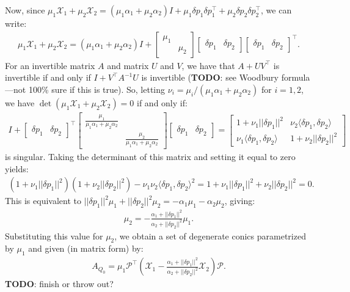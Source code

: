 \documentclass{article}
\theoremstyle{definition}
\begin{document}
Now, since
$\mu_1 \mathcal{X}_1 + \mu_2 \mathcal{X}_2 = (\mu_1 \alpha_1 + \mu_2 \alpha_2) I + \mu_1
\delta p_1 \delta p_1^\top + \mu_2 \delta p_2 \delta p_2^\top$, we can write:
\begin{align*}
  \mu_1 \mathcal{X}_1 + \mu_2 \mathcal{X}_2 = (\mu_1 \alpha_1 + \mu_2 \alpha_2) I + \begin{bmatrix} \mu_1 & \\ & \mu_2 \end{bmatrix} \begin{bmatrix} \delta p_1 & \delta p_2 \end{bmatrix} \begin{bmatrix} \delta p_1 & \delta p_2 \end{bmatrix}^\top.
\end{align*}
For an invertible matrix $A$ and matrix $U$ and $V$, we have that
$A + UV^\top$ is invertible if and only if $I + V^\top A^{-1} U$ is
invertible (\textbf{TODO}: see Woodbury formula---not 100\% sure if
this is true). So, letting
$\nu_i = \mu_i/(\mu_1 \alpha_1 + \mu_2 \alpha_2)$ for $i = 1, 2$, we
have $\det(\mu_1 \mathcal{X}_1 + \mu_2 \mathcal{X}_2) = 0$ if and only if:
\begin{align*}
  I + \begin{bmatrix} \delta p_1 & \delta p_2 \end{bmatrix}^\top \begin{bmatrix} \frac{\mu_1}{\mu_1 \alpha_1 + \mu_2 \alpha_2} & \\ & \frac{\mu_2}{\mu_1 \alpha_1 + \mu_2 \alpha_2} \end{bmatrix} \begin{bmatrix} \delta p_1 & \delta p_2 \end{bmatrix} = \begin{bmatrix} 1 + \nu_1 ||\delta p_1||^2 & \nu_2 \langle \delta p_1, \delta p_2 \rangle \\ \nu_1 \langle \delta p_1, \delta p_2 \rangle & 1 + \nu_2 ||\delta p_2||^2 \end{bmatrix}
\end{align*}
is singular. Taking the determinant of this matrix and setting it
equal to zero yields:
\begin{align*}
  {(1 + \nu_1 ||\delta p_1||^2)}{(1 + \nu_2 ||\delta p_2||^2)} - \nu_1 \nu_2 \langle \delta p_1, \delta p_2 \rangle^2 = 1 + \nu_1 ||\delta p_1||^2 + \nu_2 ||\delta p_2||^2 = 0.
\end{align*}
This is equivalent to $||\delta p_1||^2 \mu_1 + ||\delta p_2||^2 \mu_2 = -\alpha_1 \mu_1 - \alpha_2 \mu_2$, giving:
\begin{align*}
  \mu_2 = -\frac{\alpha_1 + ||\delta p_1||^2}{\alpha_2 + ||\delta p_2||^2} \mu_1.
\end{align*}
Substituting this value for $\mu_2$, we obtain a set of degenerate
conics parametrized by $\mu_1$ and given (in matrix form) by:
\begin{align*}
  A_{Q_0} = \mu_1 \mathcal{P}^\top \left(\mathcal{X}_1 - \frac{\alpha_1 + ||\delta p_1||^2}{\alpha_2 + ||\delta p_2||^2} \mathcal{X}_2\right) \mathcal{P}.
\end{align*}
\textbf{TODO}: finish or throw out?
\end{document}
